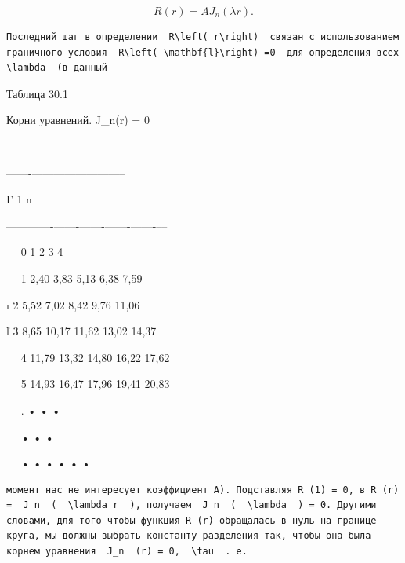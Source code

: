 \documentclass[
  ukrainian,
]{article}
\begin{document}
\[
R(r) = AJ_n(\lambda r).
\]

\begin{verbatim}
Последний шаг в определении  R\left( r\right)  связан с использованием граничного условия  R\left( \mathbf{l}\right) =0  для определения всех  \lambda  (в данный
\end{verbatim}

Таблица 30.1

Корни \textbar{} уравнений. \textbar{} J\_n(r) = 0 \textbar{}

\textbar-------\textbar------------\textbar--------------\textbar{}

\textbar-------\textbar------------\textbar--------------\textbar{}

Γ \textbar{} 1 \textbar{} n \textbar{} \textbar{} \textbar{} \textbar{}
\textbar{} \textbar{} \textbar{}

\textbar---\textbar---\textbar-------\textbar-------\textbar-------\textbar-------\textbar-------\textbar--\textbar--\textbar{}

~~\textbar{} \textbar{} 0 \textbar{} 1 \textbar{} 2 \textbar{} 3
\textbar{} 4 \textbar{} \textbar{} \textbar{}

~~\textbar{} 1 \textbar{} 2,40 \textbar{} 3,83 \textbar{} 5,13
\textbar{} 6,38 \textbar{} 7,59 \textbar{} \textbar{} \textbar{}

ı \textbar{} 2 \textbar{} 5,52 \textbar{} 7,02 \textbar{} 8,42
\textbar{} 9,76 \textbar{} 11,06 \textbar{} \textbar{} \textbar{}

ľ \textbar{} 3 \textbar{} 8,65 \textbar{} 10,17 \textbar{} 11,62
\textbar{} 13,02 \textbar{} 14,37 \textbar{} \textbar{} \textbar{}

~~\textbar{} 4 \textbar{} 11,79 \textbar{} 13,32 \textbar{} 14,80
\textbar{} 16,22 \textbar{} 17,62 \textbar{} \textbar{} \textbar{}

~~\textbar{} 5 \textbar{} 14,93 \textbar{} 16,47 \textbar{} 17,96
\textbar{} 19,41 \textbar{} 20,83 \textbar{} \textbar{} \textbar{}

~~\textbar{} . \textbar{} • \textbar{} \textbar{} • \textbar{}
\textbar{} • \textbar{} \textbar{} \textbar{}

~~\textbar{} \textbar{} \textbar{} • \textbar{} \textbar{} • \textbar{}
• \textbar{} \textbar{} \textbar{}

~~\textbar{} • \textbar{} • \textbar{} • \textbar{} • \textbar{} •
\textbar{} • \textbar{} \textbar{} \textbar{}

\begin{verbatim}
момент нас не интересует коэффициент A). Подставляя R (1) = 0, в R (r) =  J_n  (  \lambda r  ), получаем  J_n  (  \lambda  ) = 0. Другими словами, для того чтобы функция R (r) обращалась в нуль на границе круга, мы должны выбрать константу разделения так, чтобы она была корнем уравнения  J_n  (r) = 0,  \tau  . e.
\end{verbatim}
\end{document}
